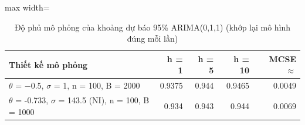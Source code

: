 \begin{table}[H]
\centering\small
\caption{Độ phủ mô phỏng của khoảng dự báo 95\% ARIMA(0,1,1) (khớp lại mô hình đúng mỗi lần)}\label{tab:tab_b12_08_coverage}
\begin{adjustbox}{max width=\linewidth}
\begin{tabular}{>{\raggedright\arraybackslash}p{}rrrr}
\toprule
Thiết kế mô phỏng & h = 1 & h = 5 & h = 10 & MCSE $\approx$ \\
\midrule
$\theta$ = $-$0.5, $\sigma$ = 1, n = 100, B = 2000 & 0.9375 & 0.944 & 0.9465 & 0.0049 \\
$\theta$ = -0.733, $\sigma$ = 143.5 (NI), n = 100, B = 1000 & 0.934 & 0.943 & 0.944 & 0.0069 \\
\bottomrule
\end{tabular}
\end{adjustbox}
\end{table}
